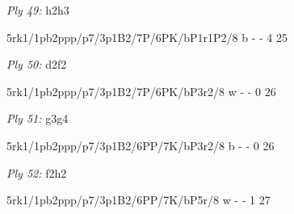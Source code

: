 \documentclass{article}
\begin{document}
\showboard

\bigskip

\emph{Ply 49:} h2h3


5rk1/1pb2ppp/p7/3p1B2/7P/6PK/bP1r1P2/8 b - - 4 25


\showboard

\bigskip

\emph{Ply 50:} d2f2

5rk1/1pb2ppp/p7/3p1B2/7P/6PK/bP3r2/8 w - - 0 26


\showboard

\bigskip

\emph{Ply 51:} g3g4


5rk1/1pb2ppp/p7/3p1B2/6PP/7K/bP3r2/8 b - - 0 26


\showboard

\bigskip

\emph{Ply 52:} f2h2

5rk1/1pb2ppp/p7/3p1B2/6PP/7K/bP5r/8 w - - 1 27


\showboard

\bigskip
\end{document}
